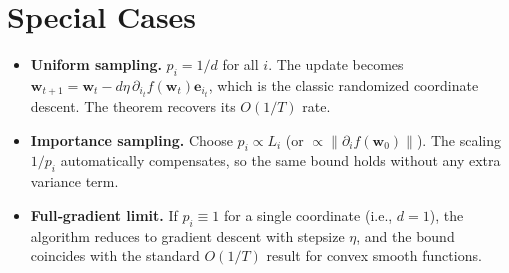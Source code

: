\documentclass{article}
\newcommand{\e}{\mathbf{e}}
\begin{document}
\section*{Special Cases}
\begin{itemize}[leftmargin=*]
\item \textbf{Uniform sampling.} $p_i=1/d$ for all $i$. The update becomes
$\mathbf w_{t+1}= \mathbf w_t-d\eta\,\partial_{i_t}f(\mathbf w_t)\e_{i_t}$,
which is the classic randomized coordinate descent. The theorem recovers its $O(1/T)$ rate.
\item \textbf{Importance sampling.} Choose $p_i\propto L_i$ (or $\propto \|\partial_i f(\mathbf w_0)\|$). The scaling $1/p_i$ automatically compensates, so the same bound holds without any extra variance term.
\item \textbf{Full‑gradient limit.} If $p_i\equiv1$ for a single coordinate (i.e., $d=1$), the algorithm reduces to gradient descent with stepsize $\eta$, and the bound coincides with the standard $O(1/T)$ result for convex smooth functions.
\end{itemize}
\end{document}
